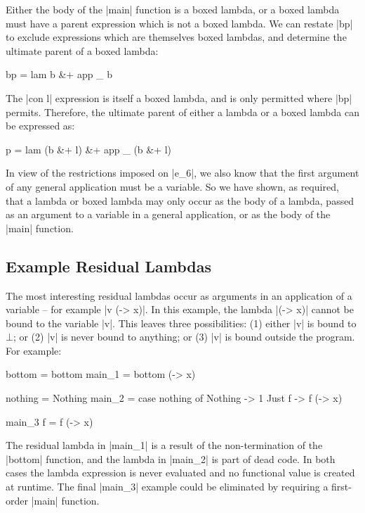 \documentclass[preprint]{sigplanconf}
\begin{document}
Either the body of the |main| function is a boxed lambda, or a boxed lambda must have a parent expression which is not a boxed lambda. We can restate |bp| to exclude expressions which are themselves boxed lambdas, and determine the ultimate parent of a boxed lambda:

\ignore\begin{code}
bp = lam b &+ app _ b
\end{code}

The |con l| expression is itself a boxed lambda, and is only permitted where |bp| permits. Therefore, the ultimate parent of either a lambda or a boxed lambda can be expressed as:

\ignore\begin{code}
p = lam (b &+ l) &+ app _ (b &+ l)
\end{code}

In view of the restrictions imposed on |e_6|, we also know that the first argument of any general application must be a variable. So we have shown, as required, that a lambda or boxed lambda may only occur as the body of a lambda, passed as an argument to a variable in a general application, or as the body of the |main| function.

\subsection{Example Residual Lambdas}
\label{sec:example_residual}

The most interesting residual lambdas occur as arguments in an application of a variable -- for example |v (\x -> x)|. In this example, the lambda |(\x -> x)| cannot be bound to the variable |v|. This leaves three possibilities: (1) either |v| is bound to $\bot{}$; or (2) |v| is never bound to anything; or (3) |v| is bound outside the program. For example:

\begin{code}
bottom = bottom
main_1 = bottom (\x -> x)

nothing = Nothing
main_2 = case  nothing of
               Nothing  -> 1
               Just f   -> f (\x -> x)

main_3 f = f (\x -> x)
\end{code}

The residual lambda in |main_1| is a result of the non-termination of the |bottom| function, and the lambda in |main_2| is part of dead code. In both cases the lambda expression is never evaluated and no functional value is created at runtime. The final |main_3| example could be eliminated by requiring a first-order |main| function.
\end{document}
